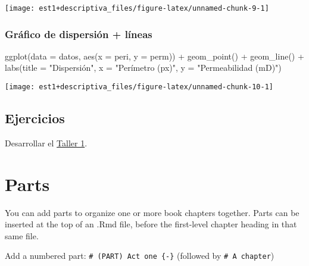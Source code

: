 \documentclass[
]{book}
\newenvironment{Shaded}{\begin{snugshade}}{\end{snugshade}}
\newcommand{\AttributeTok}[1]{\textcolor[rgb]{0.77,0.63,0.00}{#1}}
\newcommand{\FunctionTok}[1]{\textcolor[rgb]{0.00,0.00,0.00}{#1}}
\newcommand{\NormalTok}[1]{#1}
\newcommand{\SpecialCharTok}[1]{\textcolor[rgb]{0.00,0.00,0.00}{#1}}
\newcommand{\StringTok}[1]{\textcolor[rgb]{0.31,0.60,0.02}{#1}}
\theoremstyle{definition}
\theoremstyle{definition}
\theoremstyle{definition}
\theoremstyle{definition}
\theoremstyle{remark}
\begin{document}
\begin{center}\texttt{[image: est1+descriptiva\_files/figure-latex/unnamed-chunk-9-1]} \end{center}

\hypertarget{gruxe1fico-de-dispersiuxf3n-luxedneas}{%
\subsection*{Gráfico de dispersión + líneas}\label{gruxe1fico-de-dispersiuxf3n-luxedneas}}

\begin{Shaded}
\begin{Highlighting}[]
\FunctionTok{ggplot}\NormalTok{(}\AttributeTok{data =}\NormalTok{ datos, }\FunctionTok{aes}\NormalTok{(}\AttributeTok{x =}\NormalTok{ peri, }\AttributeTok{y =}\NormalTok{ perm)) }\SpecialCharTok{+} 
  \FunctionTok{geom\_point}\NormalTok{() }\SpecialCharTok{+} 
  \FunctionTok{geom\_line}\NormalTok{() }\SpecialCharTok{+}
  \FunctionTok{labs}\NormalTok{(}\AttributeTok{title =} \StringTok{"Dispersión"}\NormalTok{, }\AttributeTok{x =} \StringTok{"Perímetro (px)"}\NormalTok{, }\AttributeTok{y =} \StringTok{"Permeabilidad (mD)"}\NormalTok{)}
\end{Highlighting}
\end{Shaded}

\begin{center}\texttt{[image: est1+descriptiva\_files/figure-latex/unnamed-chunk-10-1]} \end{center}

\hypertarget{ejercicios}{%
\section{Ejercicios}\label{ejercicios}}

Desarrollar el \href{https://colab.research.google.com/drive/1wASaDklH5qgHqfCPdri-V2cg00KflJBf?usp=sharing}{Taller 1}.

\hypertarget{parts}{%
\chapter{Parts}\label{parts}}

You can add parts to organize one or more book chapters together. Parts can be inserted at the top of an .Rmd file, before the first-level chapter heading in that same file.

Add a numbered part: \texttt{\#\ (PART)\ Act\ one\ \{-\}} (followed by \texttt{\#\ A\ chapter})
\end{document}
